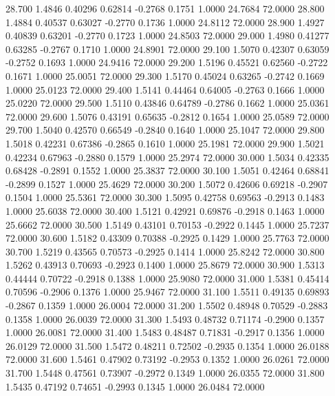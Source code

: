   28.700   1.4846   0.40296   0.62814  -0.2768   0.1751   1.0000  24.7684  72.0000
  28.800   1.4884   0.40537   0.63027  -0.2770   0.1736   1.0000  24.8112  72.0000
  28.900   1.4927   0.40839   0.63201  -0.2770   0.1723   1.0000  24.8503  72.0000
  29.000   1.4980   0.41277   0.63285  -0.2767   0.1710   1.0000  24.8901  72.0000
  29.100   1.5070   0.42307   0.63059  -0.2752   0.1693   1.0000  24.9416  72.0000
  29.200   1.5196   0.45521   0.62560  -0.2722   0.1671   1.0000  25.0051  72.0000
  29.300   1.5170   0.45024   0.63265  -0.2742   0.1669   1.0000  25.0123  72.0000
  29.400   1.5141   0.44464   0.64005  -0.2763   0.1666   1.0000  25.0220  72.0000
  29.500   1.5110   0.43846   0.64789  -0.2786   0.1662   1.0000  25.0361  72.0000
  29.600   1.5076   0.43191   0.65635  -0.2812   0.1654   1.0000  25.0589  72.0000
  29.700   1.5040   0.42570   0.66549  -0.2840   0.1640   1.0000  25.1047  72.0000
  29.800   1.5018   0.42231   0.67386  -0.2865   0.1610   1.0000  25.1981  72.0000
  29.900   1.5021   0.42234   0.67963  -0.2880   0.1579   1.0000  25.2974  72.0000
  30.000   1.5034   0.42335   0.68428  -0.2891   0.1552   1.0000  25.3837  72.0000
  30.100   1.5051   0.42464   0.68841  -0.2899   0.1527   1.0000  25.4629  72.0000
  30.200   1.5072   0.42606   0.69218  -0.2907   0.1504   1.0000  25.5361  72.0000
  30.300   1.5095   0.42758   0.69563  -0.2913   0.1483   1.0000  25.6038  72.0000
  30.400   1.5121   0.42921   0.69876  -0.2918   0.1463   1.0000  25.6662  72.0000
  30.500   1.5149   0.43101   0.70153  -0.2922   0.1445   1.0000  25.7237  72.0000
  30.600   1.5182   0.43309   0.70388  -0.2925   0.1429   1.0000  25.7763  72.0000
  30.700   1.5219   0.43565   0.70573  -0.2925   0.1414   1.0000  25.8242  72.0000
  30.800   1.5262   0.43913   0.70693  -0.2923   0.1400   1.0000  25.8679  72.0000
  30.900   1.5313   0.44444   0.70722  -0.2918   0.1388   1.0000  25.9080  72.0000
  31.000   1.5381   0.45414   0.70596  -0.2906   0.1376   1.0000  25.9467  72.0000
  31.100   1.5511   0.49135   0.69893  -0.2867   0.1359   1.0000  26.0004  72.0000
  31.200   1.5502   0.48948   0.70529  -0.2883   0.1358   1.0000  26.0039  72.0000
  31.300   1.5493   0.48732   0.71174  -0.2900   0.1357   1.0000  26.0081  72.0000
  31.400   1.5483   0.48487   0.71831  -0.2917   0.1356   1.0000  26.0129  72.0000
  31.500   1.5472   0.48211   0.72502  -0.2935   0.1354   1.0000  26.0188  72.0000
  31.600   1.5461   0.47902   0.73192  -0.2953   0.1352   1.0000  26.0261  72.0000
  31.700   1.5448   0.47561   0.73907  -0.2972   0.1349   1.0000  26.0355  72.0000
  31.800   1.5435   0.47192   0.74651  -0.2993   0.1345   1.0000  26.0484  72.0000
